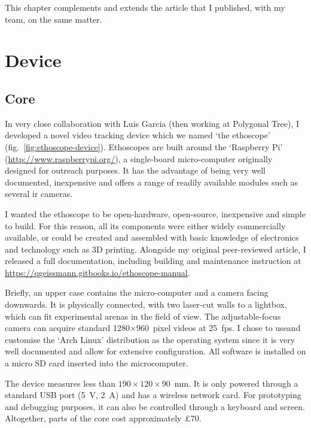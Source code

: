 This chapter complements and extends the article that I published, with my team, on the same matter\cite{geissmann_ethoscopes_2017}.

\section{Device}

\subsection{Core}
In very close collaboration with Luis Garcia (then working at Polygonal Tree), I developed a novel video tracking device which we named `the ethoscope' (fig.~\ref{fig:ethoscope-device}).
Ethoscopes are built around the `Raspberry Pi' (\url{http://www.raspberrypi.org/}), a single-board micro-computer originally designed for outreach purposes.
It has the advantage of being very well documented, inexpensive and offers a range of readily available modules such as several \gls{ir} cameras.




I wanted the ethoscope to be open-hardware, open-source, inexpensive and simple to build.
For this reason, all its components were either widely commercially available, or could be created and assembled with basic knowledge of electronics and technology such as 3D printing. 
Alongside my original peer-reviewed article, I released a full documentation, including building and maintenance instruction at \url{https://qgeissmann.gitbooks.io/ethoscope-manual}.

Briefly, an upper case contains the micro-computer and a camera facing downwards.
It is physically connected, with two laser-cut walls to a lightbox, which can fit experimental arenas in the field of view.
The adjustable-focus camera can acquire standard 1280$\times$960~pixel videos at 25~\gls{fps}.
I chose to use\emd{}and customise\emd{} the `Arch Linux' distribution as the operating system since it is very well documented and allow for extensive configuration. All software is installed on a micro SD card inserted into the microcomputer.

The device measures less than $190\times{}120\times{}90$~mm.
It is only powered through a standard USB port (5~V, 2~A) and has a wireless network card.
For prototyping and debugging purposes, it can also be controlled through a keyboard and screen.
Altogether, parts of the core cost approximately \pounds70.

